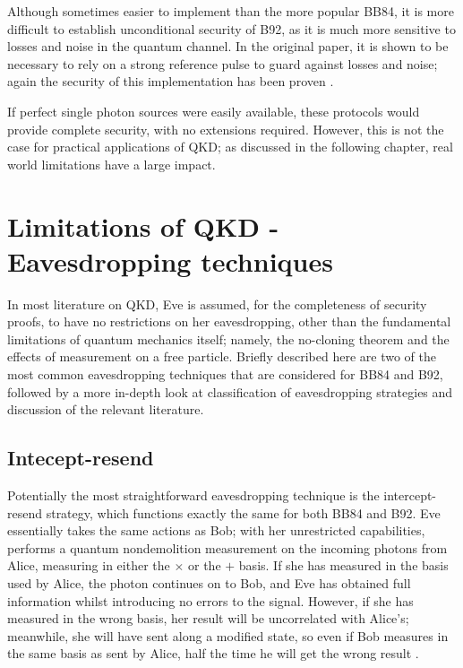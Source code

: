 \documentclass[paper=a4, fontsize=11pt]{scrartcl} %
\numberwithin{equation}{section} %
\numberwithin{figure}{section} %
\numberwithin{table}{section} %
\begin{document}
Although sometimes easier to implement than the more popular BB84, it is more difficult to establish
unconditional security of B92, as it is much more sensitive to losses and noise in the
quantum channel. In the original paper, it is shown to be necessary
to rely on a strong reference pulse to guard against
losses and noise; again the security of this implementation has been proven
\citep{tamakiStrongRefProofB92}.

If perfect single photon sources were easily available,
these protocols would provide complete security, with no extensions required.
However, this is not the case for practical applications of QKD;
as discussed in the following chapter, real world limitations have a large impact.

\clearpage
\section{Limitations of QKD - Eavesdropping techniques}
In most literature on QKD, Eve is assumed, for the completeness of security proofs, to have no restrictions
on her eavesdropping, other than the fundamental limitations of quantum mechanics itself; namely, the
no-cloning theorem and the effects of measurement on a free particle. Briefly described here are two of the
most common eavesdropping techniques that are considered for BB84 and B92, followed by a more in-depth look
at classification of eavesdropping strategies and discussion of the relevant literature.

\subsection{Intecept-resend}
Potentially the most straightforward eavesdropping technique is the intercept-resend
strategy, which functions exactly the same for both BB84 and  B92.
Eve essentially takes the same actions as Bob; with her unrestricted capabilities, performs
a quantum nondemolition measurement on the incoming photons from Alice, measuring in either the $\times$
or the $+$ basis. If she has measured in the basis used by Alice, the photon continues on to Bob,
and Eve has obtained full information whilst introducing no errors to the signal. However, if she has measured
in the wrong basis, her result will be uncorrelated with Alice's; meanwhile, she will have sent along
a modified state, so even if Bob measures in the same basis as sent by Alice, half the time he will get the
wrong result \citep{reviewScariani}.
\end{document}
